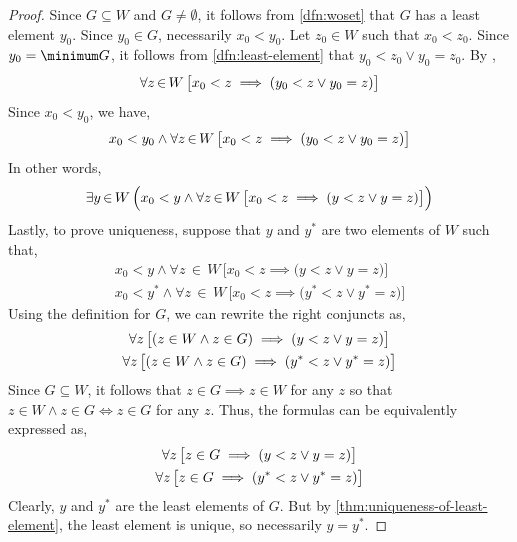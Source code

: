 \begin{proof}
    \vspace{0.3cm}
    \noindent
    Since \( G \subseteq W \) and \( G \neq \emptyset \), it follows from \cref{dfn:woset} that \( G \) has a least element \( y_{0} \). Since
    \( y_{0} \in G \), necessarily \( x_{0} < y_{0} \). Let \( z_{0} \in W \) such that \( x_{0} < z_{0} \). Since \( y_{0} = \minimum G \), it
    follows from \cref{dfn:least-element} that \( y_{0} < z_{0} \lor y_{0} = z_{0} \). By ,
    \begin{equation*}
        \forall z\,{\in}\,W \, \big[ x_{0} < z \implies \mleft( y_{0} < z \lor y_{0} = z \mright) \big]
    \end{equation*}
    Since \( x_{0} < y_{0} \), we have,
    \begin{equation*}
        x_{0} < y_{0} \land \forall z\,{\in}\,W \, \big[ x_{0} < z \implies \mleft( y_{0} < z \lor y_{0} = z \mright) \big]
    \end{equation*}
    In other words,
    \begin{equation*}
        \exists y\,{\in}\,W \, \Big( x_{0} < y \land \forall z\,{\in}\,W \, \big[ x_{0} < z \implies \mleft( y < z \lor y = z \mright) \big] \Big)
    \end{equation*}
    Lastly, to prove uniqueness, suppose that \( y \) and \( y^{*} \) are two elements of \( W \) such that,
    \begin{gather*}
        x_{0} < y \land \forall z\,{\in}\,W \, \big[ x_{0} < z \implies \big( y < z \lor y = z \big) \big]\\
        x_{0} < y^{*} \land \forall z\,{\in}\,W \, \big[ x_{0} < z \implies \big( y^{*} < z \lor y^{*} = z \big) \big]
    \end{gather*}
    Using the definition for \( G \), we can rewrite the right conjuncts as,
    \begin{gather*}
        \forall z \, \big[ \mleft( z \in W \land z \in G \mright) \implies \mleft( y < z \lor y = z \mright) \big] \\
        \forall z \, \big[ \mleft( z \in W \land z \in G \mright) \implies \mleft( y^{*} < z \lor y^{*} = z \mright) \big]
    \end{gather*}
    Since \( G \subseteq W \), it follows that \( z \in G {\implies} z \in W \) for any \( z \) so that \( z \in W \land z \in G {\iff} z \in G \) for any \( z \).
    Thus, the formulas can be equivalently expressed as,
    \begin{gather*}
        \forall z \, \big[ z \in G \implies \mleft( y < z \lor y = z \mright) \big]\\
        \forall z \, \big[ z \in G \implies \mleft( y^{*} < z \lor y^{*} = z \mright) \big]
    \end{gather*}
    Clearly, \( y \) and \( y^{*} \) are the least elements of \( G \). But by \cref{thm:uniqueness-of-least-element}, the least element
    is unique, so necessarily \( y = y^{*} \).
\end{proof}

